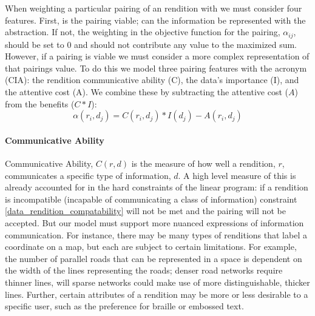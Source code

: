 When weighting a particular pairing of an rendition with we must consider four features. First, is the pairing viable; can the information be represented with the abstraction. If not, the weighting in the objective function for the pairing, $\alpha_{ij}$, should be set to 0 and should not contribute any value to the maximized sum. However, if a pairing is viable we must consider a more complex representation of that pairings value. To do this we model three pairing features with the acronym (CIA): the rendition communicative ability (C), the data's importance (I), and the  attentive cost (A). We combine these by subtracting the attentive cost ($A$)  from the benefits ($C*I$): 
\begin{equation}
\label{eq::CIA}
\alpha(r_i, d_j) = C(r_i, d_j)*I(d_j)-A(r_i, d_j)
\end{equation}
\paragraph{Communicative Ability}
Communicative Ability, $C(r,d)$ is the measure of how well a rendition, $r$, communicates a specific type of information, $d$. A high level measure of this is already accounted for in the hard constraints of the linear program: if a rendition is incompatible (\ie incapable of communicating a class of information) constraint \ref{data_rendition_compatability} will not be met and the pairing will not be accepted. But our model must support more nuanced expressions of information communication. For instance, there may be many types of renditions that label a coordinate on a map, but each are subject to certain limitations. For example, the number of parallel roads that can be represented in a space is dependent on the width of the lines representing the roads; denser road networks require thinner lines, will sparse networks could make use of more distinguishable, thicker lines. Further, certain attributes of a rendition may be more or less desirable to a specific user, such as the preference for braille or embossed text. 

